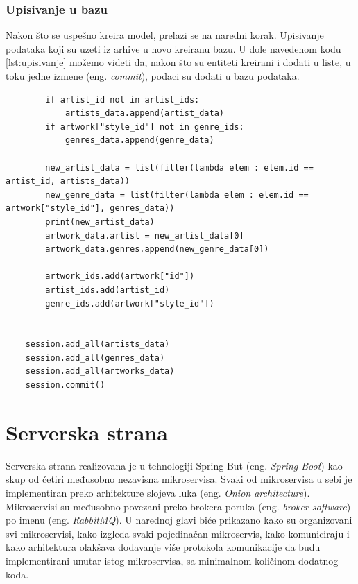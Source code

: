 \documentclass[12pt,oneside]{memoir}
\begin{document}
\subsection{Upisivanje u bazu}

Nakon što se uspešno kreira model, prelazi se na naredni korak. Upisivanje podataka koji su uzeti iz arhive 
u novo kreiranu bazu. U dole navedenom kodu \ref{lst:upisivanje} možemo videti da, nakon što su entiteti kreirani 
i dodati u liste, u toku jedne izmene (eng. \textit{commit}), podaci su dodati u bazu podataka. 


\begin{lstlisting}
        if artist_id not in artist_ids:  
            artists_data.append(artist_data)
        if artwork["style_id"] not in genre_ids:
            genres_data.append(genre_data)

        new_artist_data = list(filter(lambda elem : elem.id == artist_id, artists_data))
        new_genre_data = list(filter(lambda elem : elem.id == artwork["style_id"], genres_data))
        print(new_artist_data)
        artwork_data.artist = new_artist_data[0]
        artwork_data.genres.append(new_genre_data[0])

        artwork_ids.add(artwork["id"])
        artist_ids.add(artist_id)
        genre_ids.add(artwork["style_id"])


    session.add_all(artists_data)
    session.add_all(genres_data)
    session.add_all(artworks_data)
    session.commit()

\end{lstlisting}

\chapter{Serverska strana}
Serverska strana realizovana je u tehnologiji Spring But (eng. \textit{Spring Boot}) kao skup od četiri međusobno 
nezavisna mikroservisa. Svaki od mikroservisa u sebi je implementiran preko arhitekture slojeva luka (eng. \textit{Onion architecture}).
Mikroservisi su međusobno povezani preko brokera poruka (eng. \textit{broker software})
po imenu (eng. \textit{RabbitMQ}). U narednoj glavi biće prikazano kako su organizovani svi mikroservisi, 
kako izgleda svaki pojedinačan mikroservis, kako komuniciraju i kako arhitektura olakšava dodavanje 
više protokola komunikacije da budu implementirani unutar istog mikroservisa, sa minimalnom količinom dodatnog koda.
\end{document}
